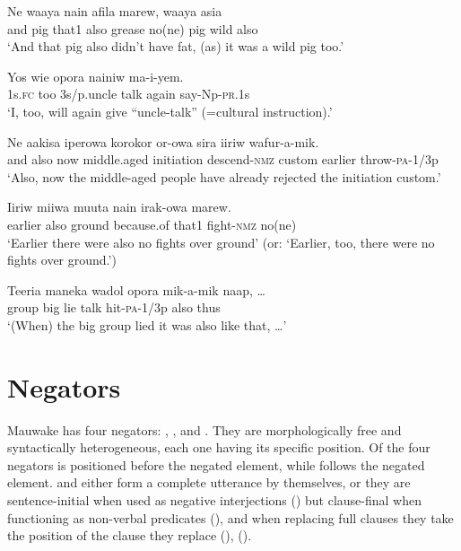\ea%
\label{ex:x749}
\gll Ne waaya nain  afila marew, waaya asia  \\
and pig that1 also grease no(ne) pig wild also\\
\glt`And that pig also didn't have fat, (as) it was a wild pig too.'
\z

\ea%
\label{ex:x1937}
\gll Yos  wie opora nainiw ma-i-yem. \\
1s.\textsc{fc} too 3s/p.uncle talk again say-Np-\textsc{pr}.1s\\
\glt`I, too, will again give ``uncle-talk'' (=cultural instruction).'
\z

\ea%
\label{ex:x750}
\gll Ne  aakisa iperowa korokor or-owa sira iiriw wafur-a-mik.\\
and also now middle.aged initiation descend-\textsc{nmz} custom earlier throw-\textsc{pa}-1/3p\\
\glt`Also, now the middle-aged people have already rejected the initiation custom.'
\z

\ea%
\label{ex:x751}
\gll Iiriw  miiwa muuta nain irak-owa marew. \\
earlier also ground because.of that1 fight-\textsc{nmz} no(ne)\\
\glt`Earlier there were also no fights over ground' (or: `Earlier, too, there were no fights over ground.')
\z

\ea%
\label{ex:x808}
\gll Teeria maneka wadol opora mik-a-mik  naap, {\dots} \\
group big lie talk hit-\textsc{pa}-1/3p also thus\\
\glt`(When) the big group lied it was also like that, {\dots}'
\z

\section{Negators} 
{}
Mauwake has four negators: , ,  and . They are morphologically free and syntactically heterogeneous, each one having its specific position. Of the four negators  is positioned before the negated element, while  follows the negated element.  and  either form a complete utterance by themselves, or they are sentence-initial when used as negative interjections () but clause-final when functioning as non-verbal predicates (), and when replacing full clauses they take the position of the clause they replace (), (). 

